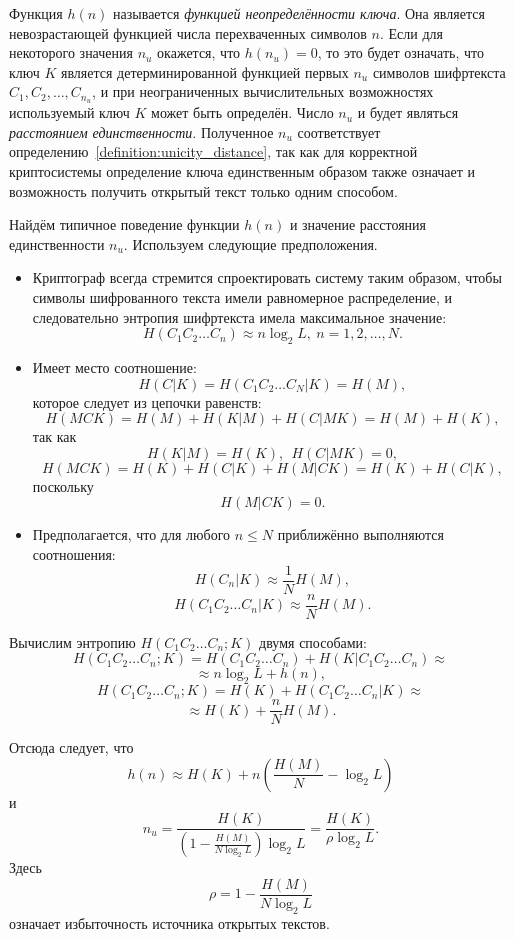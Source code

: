 Функция $h(n)$ называется \emph{функцией неопределённости ключа}. Она является невозрастающей функцией числа перехваченных символов $n$. Если для некоторого значения $n_u$ окажется, что $h ( n_u ) = 0$, то это будет означать, что ключ $K$ является детерминированной функцией первых $n_u$ символов шифртекста $C_1, C_2, \dots, C_{n_u}$, и при неограниченных вычислительных возможностях используемый ключ $K$ может быть определён. Число $n_u$ и будет являться \emph{расстоянием единственности}. Полученное $n_u$ соответствует определению~\ref{definition:unicity_distance}, так как для корректной криптосистемы определение ключа единственным образом также означает и возможность получить открытый текст только одним способом.

Найдём типичное поведение функции $h(n)$ и значение расстояния единственности $n_u$. Используем следующие предположения.
\begin{itemize}
    \item Криптограф всегда стремится спроектировать систему таким образом, чтобы символы шифрованного текста имели равномерное распределение, и следовательно энтропия шифртекста имела максимальное значение:
            \[ H(C_1 C_2 \dots C_n) \approx n \log_2 L, ~ n = 1, 2, \dots, N. \]
    \item Имеет место соотношение:
            \[ H(C | K) = H(C_1 C_2 \dots C_N | K)  =  H(M), \]
        которое следует из цепочки равенств:
            \[ H(MCK) = H(M) + H(K | M) + H(C | MK) = H(M) + H(K), \]
        так как
            \[ H(K | M) = H(K), ~~ H(C | MK) = 0, \]
            \[H(MCK) = H(K) + H(C | K) + H(M | CK) = H(K) + H(C | K), \]
        поскольку
            \[ H(M | CK) = 0. \]
    \item Предполагается, что для любого $n \leq N$ приближённо выполняются соотношения:
        \[ H(C_n | K) \approx \frac{1}{N} H(M), \]
        \[ H(C_1 C_2\dots C_n | K) \approx \frac{n}{N} H(M). \]
\end{itemize}

Вычислим энтропию $H(C_1 C_2 \dots C_n ; K)$ двумя способами:
    \[ H( C_1 C_2 \dots C_n ; K ) = H(C_1 C_2 \dots C_n) + H(K | C_1 C_2 \dots C_n) \approx \]
        \[ \approx n \log_2 L + h(n), \]
    \[ H( C_1 C_2 \dots C_n ; K ) = H(K) + H(C_1 C_2 \dots C_n | K) \approx \]
        \[ \approx H(K) + \frac{n}{N} H(M). \]

Отсюда следует, что
    \[ h(n) \approx H(K) + n \left( \frac{H(M)}{N} - \log_2 L \right) \]
и
    \[ n_u = \frac{H(K)}{ \left( 1 - \frac{H(M)}{N \log_2 L} \right) \log_2 L} = \frac{H(K)}{\rho \log_2 L}. \]
Здесь
    \[ \rho = 1 - \frac{H(M)}{N \log_2 L} \]
означает избыточность источника открытых текстов.

